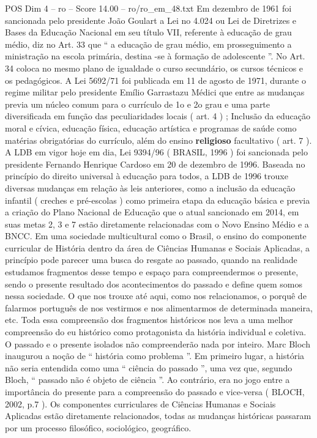 \begin{textsample}{POS Dim 4 – ro – Score 14.00 – ro/ro\_em\_48.txt}
Em dezembro de 1961 foi sancionada pelo presidente João Goulart a Lei no 4.024 ou Lei de Diretrizes e Bases da Educação Nacional em seu título VII, referente à educação de grau médio, diz no Art. 33 que “ a educação de grau médio, em prosseguimento a ministração na escola primária, destina -se à formação de adolescente ”.
No Art. 34 coloca no mesmo plano de igualdade o curso secundário, os cursos técnicos e os pedagógicos.
A Lei 5692/71 foi publicada em 11 de agosto de 1971, durante o regime militar pelo presidente Emílio Garrastazu Médici que entre as mudanças previa um núcleo comum para o currículo de 1o e 2o grau e uma parte diversificada em função das peculiaridades locais ( art. 4 ) ; Inclusão da educação moral e cívica, educação física, educação artística e programas de saúde como matérias obrigatórias do currículo, além do ensino \textbf{religioso} facultativo ( art. 7 ).
A LDB em vigor hoje em dia, Lei 9394/96 ( BRASIL, 1996 ) foi sancionada pelo presidente Fernando Henrique Cardoso em 20 de dezembro de 1996.
Baseada no princípio do direito universal à educação para todos, a LDB de 1996 trouxe diversas mudanças em relação às leis anteriores, como a inclusão da educação infantil ( creches e pré-escolas ) como primeira etapa da educação básica e previa a criação do Plano Nacional de Educação que o atual sancionado em 2014, em suas metas 2, 3 e 7 estão diretamente relacionadas com o Novo Ensino Médio e a BNCC.
Em uma sociedade multicultural como o Brasil, o ensino do componente curricular de História dentro da área de Ciências Humanas e Sociais Aplicadas, a princípio pode parecer uma busca do resgate ao passado, quando na realidade estudamos fragmentos desse tempo e espaço para compreendermos o presente, sendo o presente resultado dos acontecimentos do passado e define quem somos nessa sociedade.
O que nos trouxe até aqui, como nos relacionamos, o porquê de falarmos português de nos vestirmos e nos alimentarmos de determinada maneira, etc.
Toda essa compreensão dos fragmentos históricos nos leva a uma melhor compreensão do eu histórico como protagonista da história individual e coletiva.
O passado e o presente isolados não compreenderão nada por inteiro.
Marc Bloch inaugurou a noção de “ história como problema ”.
Em primeiro lugar, a história não seria entendida como uma “ ciência do passado ”, uma vez que, segundo Bloch, “ passado não é objeto de ciência ”.
Ao contrário, era no jogo entre a importância do presente para a compreensão do passado e vice-versa ( BLOCH, 2002, p.7 ).
Os componentes curriculares de Ciências Humanas e Sociais Aplicadas estão diretamente relacionados, todas as mudanças históricas passaram por um processo filosófico, sociológico, geográfico.

\end{textsample}
